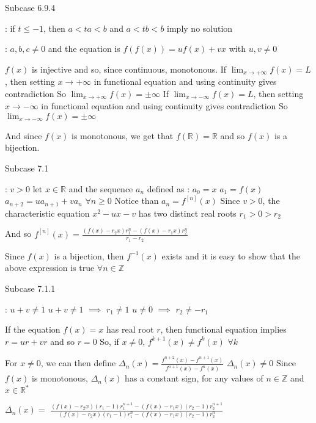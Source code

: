 \begin{solution}
\begin{bolded}Subcase 6.9.4\end{bolded} : if $t\le -1$, then $a< ta<b$ and $a< tb< b$ imply no solution


 : $a,b,c\ne 0$ and the equation is $f(f(x))=uf(x)+vx$ with $u,v\ne 0$

$f(x)$ is injective and so, since continuous, monotonous.
If $\lim_{x\to+\infty}f(x)=L$, then setting $x\to+\infty$ in functional equation and using continuity gives contradiction
So $\lim_{x\to+\infty}f(x)=\pm\infty$
If $\lim_{x\to-\infty}f(x)=L$, then setting $x\to-\infty$ in functional equation and using continuity gives contradiction
So $\lim_{x\to-\infty}f(x)=\pm\infty$

And since $f(x)$ is monotonous, we get that $f(\mathbb R)=\mathbb R$ and so $f(x)$ is a bijection.

\begin{bolded}Subcase 7.1\end{bolded} : $v>0$
let $x\in\mathbb R$ and the sequence $a_n$ defined as :
$a_0=x$
$a_1=f(x)$
$a_{n+2}=ua_{n+1}+va_n$ $\forall n\ge 0$
Notice than $a_n=f^{[n]}(x)$
Since $v>0$, the characteristic equation $x^2-ux-v$ has two distinct real roots $r_1>0>r_2$

And so $f^{[n]}(x)=\frac{(f(x)-r_2x)r_1^n-(f(x)-r_1x)r_2^n}{r_1-r_2}$

Since $f(x)$ is a bijection, then $f^{-1}(x)$ exists and it is easy to show that the above expression is true $\forall n\in\mathbb Z$

\begin{bolded}Subcase 7.1.1\end{bolded} : $u+v\ne 1$ 
$u+v\ne 1$ $\implies$ $r_1\ne 1$
$u\ne 0$ $\implies$ $r_2\ne -r_1$

If the equation $f(x)=x$ has real root $r$, then functional equation implies $r=ur+vr$ and so $r=0$
So, if $x\ne 0$, $f^{k+1}(x)\ne f^k(x)$ $\forall k$

For $x\ne 0$, we can then define $\Delta_n(x)=\frac{f^{n+2}(x)-f^{n+1}(x)}{f^{n+1}(x)-f^{n}(x)}$
$\Delta_n(x)\ne 0$
Since $f(x)$ is monotonous, $\Delta_n(x)$ has a constant sign, for any values of $n\in\mathbb Z$ and $x\in\mathbb R^*$

$\Delta_n(x)=$ $\frac{(f(x)-r_2x)(r_1-1)r_1^{n+1}-(f(x)-r_1x)(r_2-1)r_2^{n+1}}{(f(x)-r_2x)(r_1-1)r_1^{n}-(f(x)-r_1x)(r_2-1)r_2^{n}}$


\end{solution}
